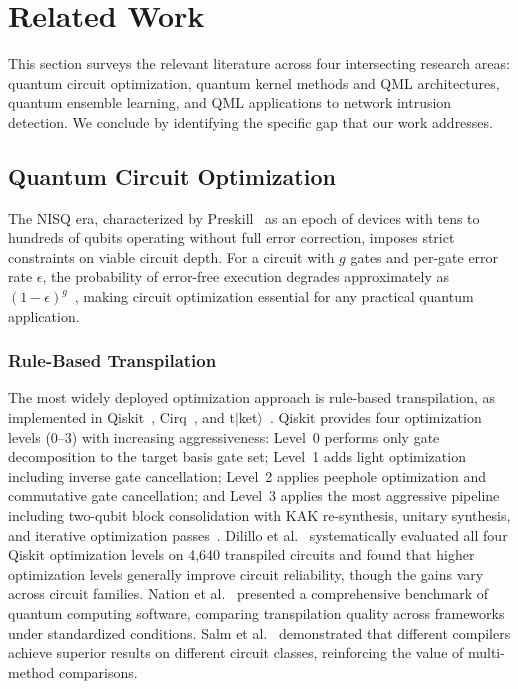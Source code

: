 \documentclass{ieeeaccess}
\begin{document}
\section{Related Work}
\label{sec:related_work}

This section surveys the relevant literature across four intersecting research areas: quantum circuit optimization, quantum kernel methods and QML architectures, quantum ensemble learning, and QML applications to network intrusion detection. We conclude by identifying the specific gap that our work addresses.

\subsection{Quantum Circuit Optimization}
\label{sec:rw_optimization}

The NISQ era, characterized by Preskill~\cite{Preskill2018} as an epoch of devices with tens to hundreds of qubits operating without full error correction, imposes strict constraints on viable circuit depth. For a circuit with $g$ gates and per-gate error rate $\epsilon$, the probability of error-free execution degrades approximately as $(1-\epsilon)^g$~\cite{Cross2019}, making circuit optimization essential for any practical quantum application.

\subsubsection{Rule-Based Transpilation}
The most widely deployed optimization approach is rule-based transpilation, as implemented in Qiskit~\cite{Qiskit2024}, Cirq~\cite{Cirq2021}, and t$|$ket$\rangle$~\cite{Sivarajah2020}. Qiskit provides four optimization levels (0--3) with increasing aggressiveness: Level~0 performs only gate decomposition to the target basis gate set; Level~1 adds light optimization including inverse gate cancellation; Level~2 applies peephole optimization and commutative gate cancellation; and Level~3 applies the most aggressive pipeline including two-qubit block consolidation with KAK re-synthesis, unitary synthesis, and iterative optimization passes~\cite{Cross2022}. Dilillo et al.~\cite{Dilillo2023} systematically evaluated all four Qiskit optimization levels on 4,640 transpiled circuits and found that higher optimization levels generally improve circuit reliability, though the gains vary across circuit families. Nation et al.~\cite{Nation2025} presented a comprehensive benchmark of quantum computing software, comparing transpilation quality across frameworks under standardized conditions. Salm et al.~\cite{Salm2021} demonstrated that different compilers achieve superior results on different circuit classes, reinforcing the value of multi-method comparisons.
\end{document}
